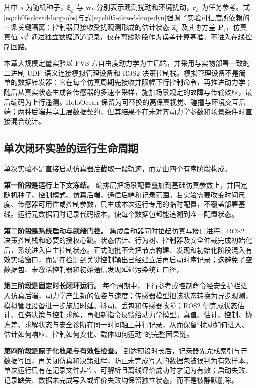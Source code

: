 其中 \(s\) 为随机种子，\(\boldsymbol{\xi}_k\) 与 \(\boldsymbol{w}_k\) 分别表示观测扰动和环境扰动，\(\boldsymbol{r}_k\) 为任务参考。式\eqref{eq:ch05-closed-loop-obs}与式\eqref{eq:ch05-closed-loop-dyn}强调了实验可信度所依赖的一条关键隔离：控制器只接收受扰观测形成的估计状态 \(\hat{\boldsymbol{x}}_k\) 及其协方差 \(\boldsymbol{P}_k\)，仿真真值 \(\boldsymbol{x}^{\mathrm{gt}}_k\) 通过独立数据通道记录，仅在离线阶段作为误差计算基准，不进入在线控制回路。

本章大规模定量实验以 PVS 六自由度动力学为主后端，并采用与实物部署一致的二进制 UDP 语义连接模拟管理设备和 ROS2 决策控制栈。模拟管理设备不是简单的数据转发器：它在每个仿真周期先接收并限幅下行控制命令，再推进动力学；随后从真实状态生成各传感器的多速率采样，施加场景规定的故障与传输效应，最后编码为上行遥测。HoloOcean 保留为可替换的高保真视觉、碰撞与环境交互后端；两种后端共享上层数据契约，但其结果不在未对齐动力学参数和场景条件时直接混合统计。

\subsection{单次闭环实验的运行生命周期}\label{sec:ch05-5-1-2}

单次实验不是直接启动仿真器后截取一段轨迹，而是由四个有序阶段构成。

\textbf{第一阶段是运行上下文冻结。} 编排层把场景配置叠加到基础仿真参数上，并固定随机种子、控制模式、仿真后端、通信后端和记录范围。若实验需要改变时间尺度、传感器可用性或控制参数，只生成本次运行专用的临时配置，不覆盖部署基线。运行元数据同时记录代码版本，使每个数据包都能追溯到唯一配置状态。

\textbf{第二阶段是系统启动与就绪门控。} 集成启动器同时拉起仿真与接口进程、ROS2 决策控制栈和必要的授权心跳。状态估计、行为树、控制器及安全仲裁完成初始化后，系统进入自主控制状态。正式跑批不会把节点构建、发现和初始化阶段混入有效实验窗口，而是在检测到关键控制输出已经建立后再启动时序记录；这避免了空数据包、未激活控制器和初始通信发现延迟污染统计口径。

\textbf{第三阶段是固定时长闭环运行。} 每个周期中，下行参考或控制命令经安全护栏进入仿真后端，动力学产生新的位姿与速度；传感器模型把该状态转换为异步观测，模拟管理设备进一步施加时延、抖动、丢包和传感器故障；ROS2 侧完成状态估计、任务决策与控制求解，再把新指令反馈给动力学模型。真值、估计、控制、协方差、求解状态与安全诊断在同一时间轴上并行记录，从而保留``扰动如何进入、估计如何响应、控制如何变化、载体如何运动''的完整因果链。

\textbf{第四阶段是原子化收尾与有效性检查。} 到达预设时长后，记录器先完成索引与元数据写回，再关闭仿真和决策进程，防止未完成写入的数据包被误判为有效样本。单次运行只有在记录文件非空、可解析且离线评价成功时才记为有效；启动失败、记录缺失、数据未完成写入或评价失败均保留独立状态，而不是被静默删除。

